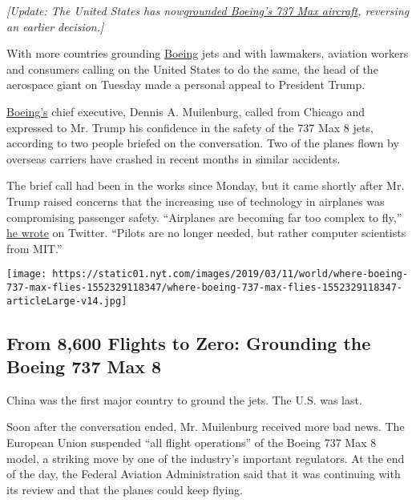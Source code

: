 \emph{{[}Update: The United States has
now}\href{https://www.nytimes.com/2019/03/13/business/canada-737-max.html}{\emph{grounded
Boeing's 737 Max aircraft}}\emph{, reversing an earlier decision.{]}}

With more countries grounding
\href{https://www.nytimes.com/2019/03/27/business/boeing-hearings.html}{Boeing}
jets and with lawmakers, aviation workers and consumers calling on the
United States to do the same, the head of the aerospace giant on Tuesday
made a personal appeal to President Trump.

\href{https://www.nytimes.com/2019/03/27/business/boeing-hearings.html}{Boeing's}
chief executive, Dennis A. Muilenburg, called from Chicago and expressed
to Mr. Trump his confidence in the safety of the 737 Max 8 jets,
according to two people briefed on the conversation. Two of the planes
flown by overseas carriers have crashed in recent months in similar
accidents.

The brief call had been in the works since Monday, but it came shortly
after Mr. Trump raised concerns that the increasing use of technology in
airplanes was compromising passenger safety. ``Airplanes are becoming
far too complex to fly,''
\href{https://twitter.com/realDonaldTrump/status/1105468569800839169}{he
wrote} on Twitter. ``Pilots are no longer needed, but rather computer
scientists from MIT.''

\href{https://www.nytimes.com/interactive/2019/03/11/world/boeing-737-max-which-airlines.html}{}

\texttt{[image: https://static01.nyt.com/images/2019/03/11/world/where-boeing-737-max-flies-1552329118347/where-boeing-737-max-flies-1552329118347-articleLarge-v14.jpg]}

\hypertarget{from-8600-flights-to-zero-grounding-the-boeing-737-max-8}{%
\subsection{From 8,600 Flights to Zero: Grounding the Boeing 737 Max
8}\label{from-8600-flights-to-zero-grounding-the-boeing-737-max-8}}

China was the first major country to ground the jets. The U.S. was last.

Soon after the conversation ended, Mr. Muilenburg received more bad
news. The European Union suspended ``all flight operations'' of the
Boeing 737 Max 8 model, a striking move by one of the industry's
important regulators. At the end of the day, the Federal Aviation
Administration said that it was continuing with its review and that the
planes could keep flying.

